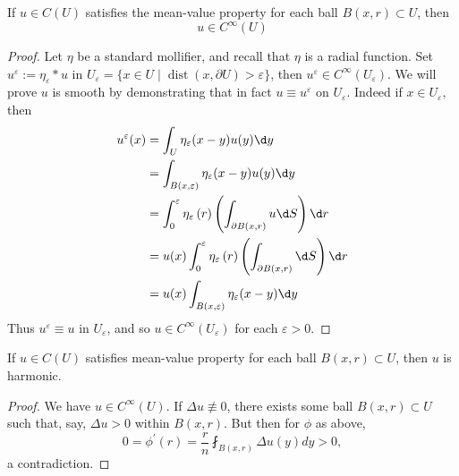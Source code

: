 \begin{theorem}[Smoothness]
    If $u \in C(U)$ satisfies the mean-value property for each ball $B(x, r) \subset U$, then
    \begin{equation*}
        u \in C^{\infty}(U)
    \end{equation*}
    \begin{proof}
        Let $\eta$ be a standard mollifier, and recall that $\eta$ is a radial function. Set $u^{\varepsilon}:=\eta_{\varepsilon} * u$ in $U_{\varepsilon}=\{x \in U \mid \operatorname{dist}(x, \partial U)>\varepsilon\}$, then $u^{\varepsilon} \in C^{\infty}\left(U_{\varepsilon}\right)$. We will prove $u$ is smooth by demonstrating that in fact $u \equiv u^{\varepsilon}$ on $U_{\varepsilon}$.
        Indeed if $x \in U_{\varepsilon}$, then
        \begin{equation*}
            \begin{aligned}
                u^{\varepsilon}(x) & =\int_U \eta_{\varepsilon}(x-y) u(y) \d y                                                                  \\
                                   & =\int_{B(x, \varepsilon)} \eta_{\varepsilon}(x-y) u(y) \d y                                                \\
                                   & = \int_0^{\varepsilon} \eta_\varepsilon \left(r\right) \left(\int_{\partial B(x, r)} u \d S\right) \d r    \\
                                   & = u(x) \int_0^{\varepsilon} \eta_\varepsilon \left(r\right) \left(\int_{\partial B(x, r)} \d S\right) \d r \\
                                   & = u(x) \int_{B(x, \varepsilon)} \eta_{\varepsilon}(x-y) \d y
            \end{aligned}
        \end{equation*}
        Thus $u^{\varepsilon} \equiv u$ in $U_{\varepsilon}$, and so $u \in C^{\infty}\left(U_{\varepsilon}\right)$ for each $\varepsilon>0$.
    \end{proof}
\end{theorem}


\begin{corollary}
    If $u \in C(U)$ satisfies  mean-value property
    for each ball $B(x, r) \subset U$, then $u$ is harmonic.
    \begin{proof}
        We have $u\in C^\infty(U)$.
        If $\Delta u \not \equiv 0$, there exists some ball $B(x, r) \subset U$ such that, say, $\Delta u>0$ within $B(x, r)$. But then for $\phi$ as above,
        \begin{equation*}
            0=\phi^{\prime}(r)=\frac{r}{n} \fint_{B(x, r)} \Delta u(y) d y>0,
        \end{equation*}
        a contradiction.
    \end{proof}
\end{corollary}


